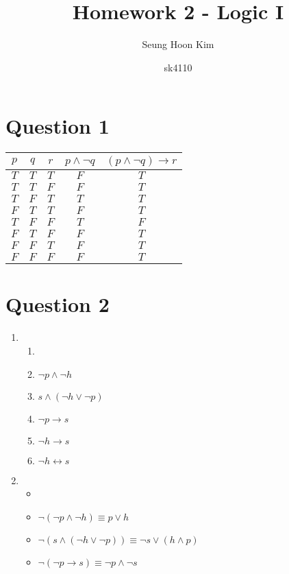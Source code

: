 \documentclass{article}
\title{Homework 2 - Logic I }
\author
{
Seung Hoon Kim 
\and sk4110
}
\begin{document}
    \maketitle
    
    \section*{Question 1}
    \begin{center}
        \begin{tabular}{ c|c|c||c||c }
         $p$ & $q$ & $r$ & $p \wedge \lnot q$ & $(p \wedge \lnot q) \rightarrow r$ \\ 
        \hline
         $T$ & $T$ & $T$ & $F$ & $T$ \\
         $T$ & $T$ & $F$ & $F$ & $T$ \\
         $T$ & $F$ & $T$ & $T$ & $T$ \\
         $F$ & $T$ & $T$ & $F$ & $T$ \\
         $T$ & $F$ & $F$ & $T$ & $F$ \\
         $F$ & $T$ & $F$ & $F$ & $T$ \\
         $F$ & $F$ & $T$ & $F$ & $T$ \\
         $F$ & $F$ & $F$ & $F$ & $T$ \\             
        \end{tabular}
    \end{center}
    \newpage
    \section*{Question 2}
    \begin{enumerate}[label=(\alph*)]
        \item 
            \begin{enumerate}[label=\arabic*.]
                \item[]
                \item $\lnot p \wedge \lnot h$
                \item $s \wedge (\lnot h \vee \lnot p)$ 
                \item $\lnot p \rightarrow s$
                \item $\lnot h \rightarrow s$
                \item $\lnot h \leftrightarrow s$
            \end{enumerate}

        \item 
            \begin{itemize}
                \item[]
                \item $\lnot(\lnot p \wedge \lnot h) \equiv p \vee h$
                \item $\lnot (s \wedge (\lnot h \vee \lnot p)) \equiv \lnot s \vee (h \wedge p)$
                \item $\lnot(\lnot p \rightarrow s) \equiv \lnot p \wedge \lnot s$
            \end{itemize}

    \end{enumerate}
    \newpage
\end{document}
